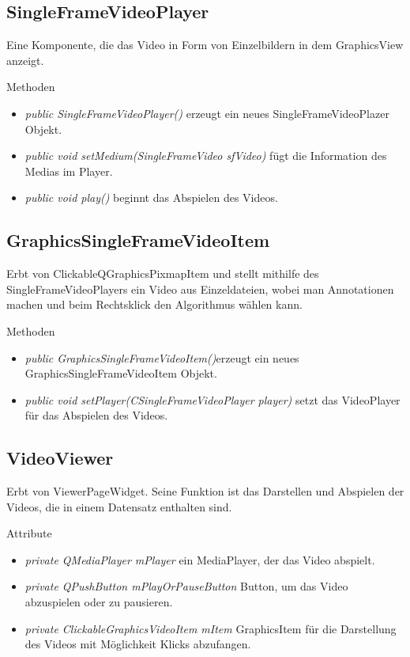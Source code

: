 \subsection*{SingleFrameVideoPlayer} 
Eine Komponente, die das Video in Form von Einzelbildern in dem GraphicsView anzeigt.

Methoden
\begin{itemize}
	\item\textit{public SingleFrameVideoPlayer()} 
	erzeugt ein neues SingleFrameVideoPlazer Objekt.
	\item\textit{public void setMedium(SingleFrameVideo sfVideo)} fügt die Information des Medias im Player.
	\item\textit{public void play()} beginnt das Abspielen des Videos.
\end{itemize}

\subsection*{GraphicsSingleFrameVideoItem}
Erbt von ClickableQGraphicsPixmapItem und stellt mithilfe des SingleFrameVideoPlayers ein Video aus Einzeldateien, wobei man Annotationen machen und beim Rechtsklick den Algorithmus wählen kann.

Methoden
\begin{itemize}
	\item\textit{public GraphicsSingleFrameVideoItem()}erzeugt ein neues GraphicsSingleFrameVideoItem Objekt.
	\item\textit{public void setPlayer(CSingleFrameVideoPlayer player)} setzt das VideoPlayer für das Abspielen des Videos.
\end{itemize}

\subsection*{VideoViewer}
Erbt von ViewerPageWidget. Seine Funktion ist das Darstellen und Abspielen der Videos, die in einem Datensatz enthalten sind.

Attribute
\begin{itemize}
	\item\textit{private QMediaPlayer mPlayer} ein MediaPlayer, der das Video abspielt. 
	\item\textit{private QPushButton mPlayOrPauseButton} Button, um das Video abzuspielen oder zu pausieren.
	\item\textit{private ClickableGraphicsVideoItem mItem} GraphicsItem für die Darstellung des Videos mit Möglichkeit Klicks abzufangen.     
\end{itemize}

